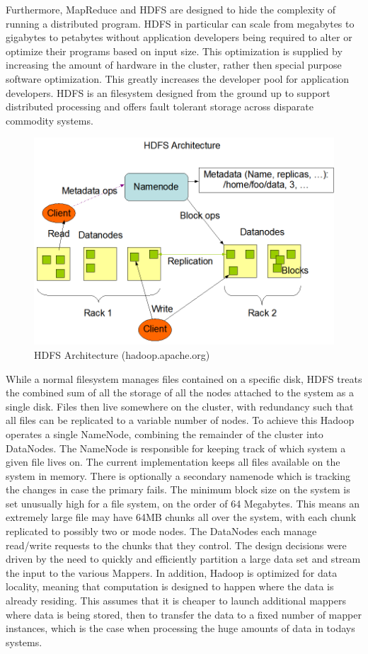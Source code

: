 \documentclass{article}
\begin{document}
Furthermore, MapReduce and HDFS are designed to hide the complexity of running a distributed program. HDFS in particular can scale from megabytes to gigabytes to petabytes without application developers being required to alter or optimize their programs based on input size. This optimization is supplied by increasing the amount of hardware in the cluster, rather then special purpose software optimization. This greatly increases the developer pool for application developers. HDFS is an filesystem designed from the ground up to support distributed processing and offers fault tolerant storage across disparate commodity systems. 

\begin{figure}[h]
\begin{center}
\includegraphics[width=120mm]{hdfsarchitecture.png}
\caption{HDFS Architecture (hadoop.apache.org)}
\label{fig:hdfs}
\end{center}
\end{figure}

While a normal filesystem manages files contained on a specific disk, HDFS treats the combined sum of all the storage of all the nodes attached to the system as a single disk. Files then live somewhere on the cluster, with redundancy such that all files can be replicated to a variable number of nodes. To achieve this Hadoop operates a single NameNode, combining the remainder of the cluster into DataNodes. The NameNode is responsible for keeping track of which system a given file lives on. The current implementation keeps all files available on the system in memory. There is optionally a secondary namenode which is tracking the changes in case the primary fails. The minimum block size on the system is set unusually high for a file system, on the order of 64 Megabytes. This means an extremely large file may have 64MB chunks all over the system, with each chunk replicated to possibly two or mode nodes. The DataNodes each manage read/write requests to the chunks that they control. The design decisions were driven by the need to quickly and efficiently partition a large data set and stream the input to the various Mappers. In addition, Hadoop is optimized for data locality, meaning that computation is designed to happen where the data is already residing. This assumes that it is cheaper to launch additional mappers where data is being stored, then to transfer the data to a fixed number of mapper instances, which is the case when processing the huge amounts of data in todays systems. 
\end{document}
